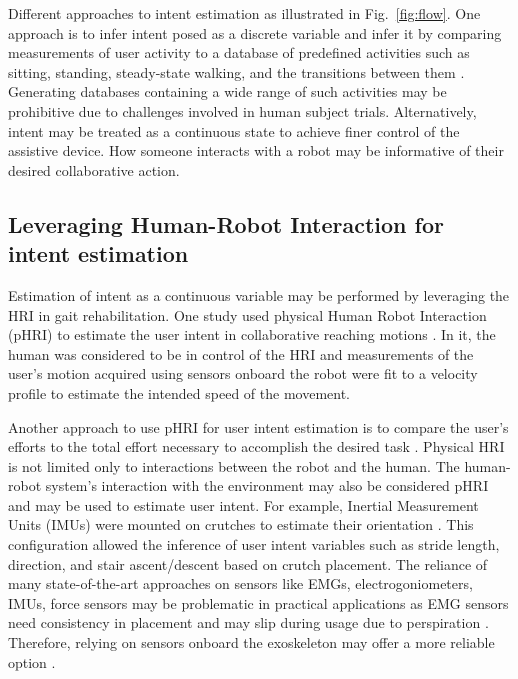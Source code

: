 Different approaches to intent estimation as illustrated in Fig.~\ref{fig:flow}. One approach is to infer intent posed as a discrete variable and infer it by comparing measurements of user activity to a database of predefined activities such as sitting, standing, steady-state walking, and the transitions between them \cite{shen2013motion}. Generating databases containing a wide range of such activities may be prohibitive due to challenges involved in human subject trials. Alternatively, intent may be treated as a continuous state to achieve finer control of the assistive device. How someone interacts with a robot may be informative of their desired collaborative action.

\subsection{Leveraging Human-Robot Interaction for intent estimation}

Estimation of intent as a continuous variable may be performed by leveraging the HRI in gait rehabilitation. One study used physical Human Robot Interaction (pHRI) to estimate the user intent in collaborative reaching motions  \cite{corteville2007human}. In it, the human was considered to be in control of the HRI and measurements of the user's motion acquired using sensors onboard the robot were fit to a velocity profile to estimate the intended speed of the movement. 

Another approach to use pHRI for user intent estimation is to compare the user's efforts to the total effort necessary to accomplish the desired task \cite{pehlivan2015minimal}. Physical HRI is not limited only to interactions between the robot and the human. The human-robot system's interaction with the environment may also be considered pHRI and may be used to estimate user intent. For example, Inertial Measurement Units (IMUs) were mounted on crutches to estimate their orientation \cite{brescianini2011ins}. This configuration allowed the inference of user intent variables such as stride length, direction, and stair ascent/descent based on crutch placement. The reliance of many state-of-the-art approaches on sensors like EMGs, electrogoniometers, IMUs, force sensors may be problematic in practical applications as EMG sensors need consistency in placement and may slip during usage due to perspiration \cite{tkach2010study,ison2014role}. Therefore, relying on sensors onboard the exoskeleton may offer a more reliable option \cite{Gambon20b}. 

